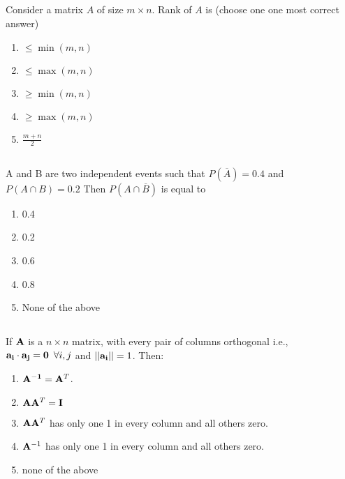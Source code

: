 \begin{frame}
\section{}
  Consider a matrix $A$ of size $m\times n$. Rank of $A$ is
  (choose one one most correct answer)
    \begin{enumerate}[label=(\Alph*)]
    \item $\leq \min(m,n)$
    \item $\leq \max (m,n)$
    \item $\geq \min(m,n)$
    \item $\geq \max(m,n)$
    \item $\frac{m+n}{2}$
    \end{enumerate}
\end{frame}

\begin{frame}
\section{}
  A and B are two independent events such that $P(\overline A) =0.4$ and $P(A \cap B) = 0.2$ Then $P(A \cap \overline B)$ is equal to
     \begin{enumerate}[label=(\Alph*)]
         \item 0.4 %
         \item 0.2
         \item 0.6
         \item 0.8
         \item None of  the above   %
     \end{enumerate}
\end{frame}

\begin{frame}
\section{}
  If ${\bf A}$ is a $n\times n$ matrix, with every pair of columns
  orthogonal i.e., ${\bf a_i\cdot a_j = 0}\,\,\, \forall i,j$ and $||{\bf a_i}|| = 1$. Then:
    \begin{enumerate}[label=(\Alph*)]
         \item ${\bf A^{-1}} = {\bf A}^T$.
         \item ${\bf A}{\bf A}^T = {\bf I}$
         \item ${\bf A}{\bf A}^T$ has only one 1 in every column and all others zero.
         \item ${\bf A}^{-1}$ has only one 1 in every column and all others zero.
         \item none of the above    %
    \end{enumerate}
\end{frame}

